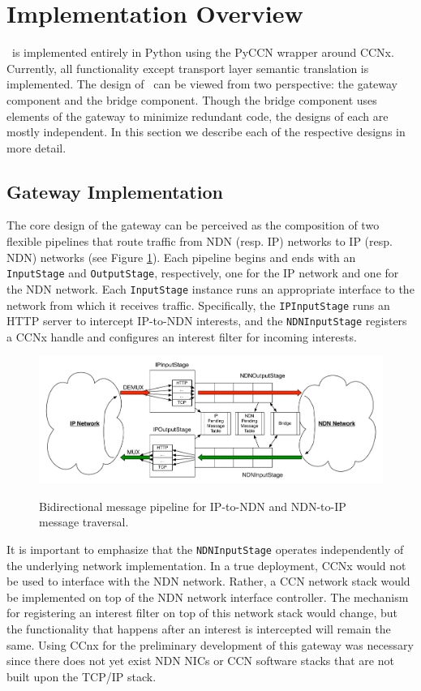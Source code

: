 \section{Implementation Overview}
\sink\ is implemented entirely in Python using the PyCCN \cite{pyccn} wrapper around CCNx. Currently, all functionality except transport layer semantic translation is implemented. The design of \sink\ can be viewed from two perspective: the gateway component and the bridge component. Though the bridge component uses elements of the gateway to minimize redundant code, the designs of each are mostly independent. In this section we describe each of the respective designs in more detail. 

\subsection{Gateway Implementation}
The core design of the gateway can be perceived as the composition of two flexible pipelines that route traffic from NDN (resp. IP) networks to IP (resp. NDN) networks (see Figure \ref{fig:pipeline}). Each pipeline begins and ends with an {\tt InputStage} and {\tt OutputStage}, respectively, one for the IP network and one for the NDN network. Each {\tt InputStage} instance runs an appropriate interface to the network from which it receives traffic. Specifically, the {\tt IPInputStage} runs an HTTP server to intercept IP-to-NDN interests, and the {\tt NDNInputStage} registers a CCNx handle and configures an interest filter for incoming interests. 

\begin{figure}[ht!]
\begin{center}
\includegraphics[scale=0.45]{./images/pipeline.pdf}
\label{fig:pipeline}
\caption{Bidirectional message pipeline for IP-to-NDN and NDN-to-IP message traversal.}
\end{center}
\end{figure}

It is important to emphasize that the {\tt NDNInputStage} operates independently of the underlying network implementation. In a true deployment, CCNx would not be used to interface with the NDN network. Rather, a CCN network stack would be implemented on top of the NDN network interface controller. The mechanism for registering an interest filter on top of this network stack would change, but the functionality that happens after an interest is intercepted will remain the same. Using CCnx for the preliminary development of this gateway was necessary since there does not yet exist NDN NICs or CCN software stacks that are not built upon the TCP/IP stack.

